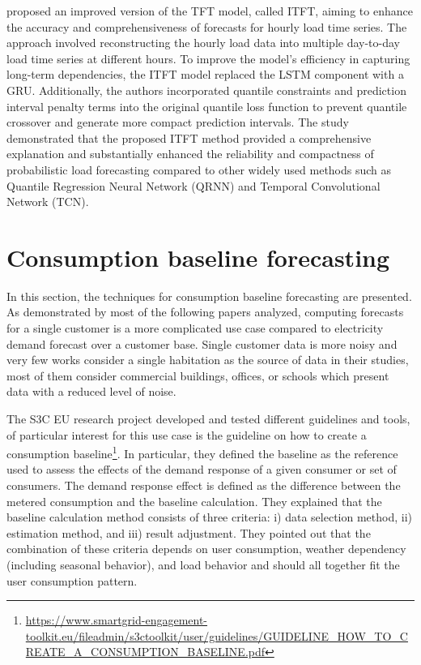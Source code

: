 \cite{LI2023108743} proposed an improved version of the TFT model, called ITFT, aiming to enhance the accuracy and comprehensiveness of forecasts for hourly load time series.
The approach involved reconstructing the hourly load data into multiple day-to-day load time series at different hours.
To improve the model's efficiency in capturing long-term dependencies, the ITFT model replaced the LSTM component with a GRU.
Additionally, the authors incorporated quantile constraints and prediction interval penalty terms into the original quantile loss function to prevent quantile crossover and generate more compact prediction intervals.
The study demonstrated that the proposed ITFT method provided a comprehensive explanation and substantially enhanced the reliability and compactness of probabilistic load forecasting compared to other widely used methods such as Quantile Regression Neural Network (QRNN) and Temporal Convolutional Network (TCN).


\section{Consumption baseline forecasting}
\label{sec:baselinesoa}
\vspace{0.2 cm}

In this section, the techniques for consumption baseline forecasting are presented.
As demonstrated by most of the following papers analyzed, computing forecasts for a single customer is a more complicated use case compared to electricity demand forecast over a customer base.
Single customer data is more noisy and very few works consider a single habitation as the source of data in their studies, most of them consider commercial buildings, offices, or schools which present data with a reduced level of noise.

The S3C EU research project developed and tested different guidelines and tools, of particular interest for this use case is the guideline on how to create a consumption baseline\footnote{ \url{https://www.smartgrid-engagement-toolkit.eu/fileadmin/s3ctoolkit/user/guidelines/GUIDELINE_HOW_TO_CREATE_A_CONSUMPTION_BASELINE.pdf} }.
In particular, they defined the baseline as the reference used to assess the effects of the demand response of a given consumer or set of consumers.
The demand response effect is defined as the difference between the metered consumption and the baseline calculation.
They explained that the baseline calculation method consists of three criteria:
i) data selection method,
ii) estimation method,
and iii) result adjustment.
They pointed out that the combination of these criteria depends on user consumption, weather dependency (including seasonal behavior), and load behavior and should all together fit the user consumption pattern.

